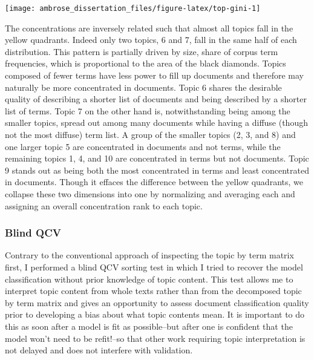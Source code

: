 \documentclass[]{book}
\theoremstyle{definition}
\theoremstyle{definition}
\theoremstyle{definition}
\theoremstyle{remark}
\begin{document}
\begin{center}\texttt{[image: ambrose\_dissertation\_files/figure-latex/top-gini-1]} \end{center}

The concentrations are inversely related such that almost all topics
fall in the yellow quadrants. Indeed only two topics, 6 and 7, fall in
the same half of each distribution. This pattern is partially driven by
size, share of corpus term frequencies, which is proportional to the
area of the black diamonds. Topics composed of fewer terms have less
power to fill up documents and therefore may naturally be more
concentrated in documents. Topic 6 shares the desirable quality of
describing a shorter list of documents and being described by a shorter
list of terms. Topic 7 on the other hand is, notwithstanding being among
the smaller topics, spread out among many documents while having a
diffuse (though not the most diffuse) term list. A group of the smaller
topics (2, 3, and 8) and one larger topic 5 are concentrated in
documents and not terms, while the remaining topics 1, 4, and 10 are
concentrated in terms but not documents. Topic 9 stands out as being
both the most concentrated in terms and least concentrated in documents.
Though it effaces the difference between the yellow quadrants, we
collapse these two dimensions into one by normalizing and averaging each
and assigning an overall concentration rank to each topic.

\hypertarget{blind-qcv}{%
\subsubsection{Blind QCV}\label{blind-qcv}}

Contrary to the conventional approach of inspecting the topic by term
matrix first, I performed a blind QCV sorting test in which I tried to
recover the model classification without prior knowledge of topic
content. This test allows me to interpret topic content from whole texts
rather than from the decomposed topic by term matrix and gives an
opportunity to assess document classification quality prior to
developing a bias about what topic contents mean. It is important to do
this as soon after a model is fit as possible--but after one is
confident that the model won't need to be refit!--so that other work
requiring topic interpretation is not delayed and does not interfere
with validation.
\end{document}
